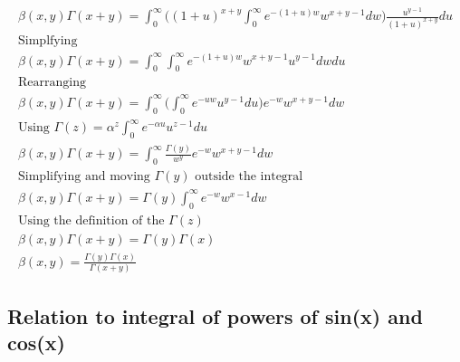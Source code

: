 \documentclass[a4paper]{article}
\begin{document}
\begin{theorem}
\begin{gather*}
            \beta(x, y) \Gamma(x+y) =
            \int_{0}^{\infty}  \Big( (1+u)^{x+y} \int_{0}^{\infty} e^{-(1+u) w} w^{x+y-1} dw \Big) \frac{u^{y-1}}{(1+u)^{x+y}} du
            \\
            \text{Simplfying}
            \\
            \beta(x, y) \Gamma(x+y) =
            \int_{0}^{\infty} \int_{0}^{\infty} e^{-(1+u) w} w^{x+y-1}  u^{y-1} dw du
            \\
            \text{Rearranging}
            \\
            \beta(x, y) \Gamma(x+y) =
            \int_{0}^{\infty} \Big( \int_{0}^{\infty} e^{-uw} u^{y-1} du \Big) e^{-w} w^{x+y-1} dw
            \\
            \text{Using $\Gamma(z) = \alpha^z  \int_{0}^{\infty} e^{-\alpha u} u^{z-1} du$}
            \\
            \beta(x, y) \Gamma(x+y) =
            \int_{0}^{\infty} \frac{\Gamma(y)}{w^y}  e^{-w} w^{x+y-1} dw
            \\
            \text{Simplifying and moving $\Gamma(y)$ outside the integral}
            \\
            \beta(x, y) \Gamma(x+y) = \Gamma(y)
            \int_{0}^{\infty} e^{-w} w^{x-1} dw
            \\
            \text{Using the definition of the $\Gamma(z)$}
            \\
            \beta(x, y) \Gamma(x+y) = \Gamma(y) \Gamma(x)
            \\
            \beta(x, y)  =\frac{\Gamma(y) \Gamma(x)}{\Gamma(x+y)}
        \end{gather*}
    \end{theorem}

    \subsection{Relation to integral of powers of sin(x) and cos(x)}\label{subsec:relation-to-integral-of-powers-of-sin(x)-and-cos(x)}
\end{document}

